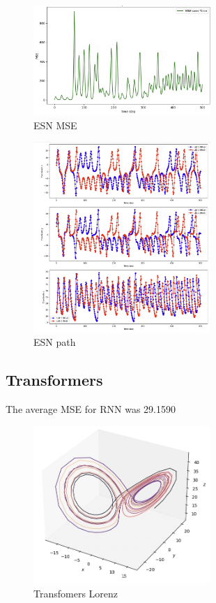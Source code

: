 \documentclass[11pt]{article}
\begin{document}
\begin{figure}[h]
\centering
\includegraphics[width=0.6\textwidth]{echo_mse.jpeg}
\caption{ESN MSE}
\end{figure}

\begin{figure}[h]
\centering
\includegraphics[width=0.6\textwidth]{echo_path.jpeg}
\caption{ESN path}
\end{figure}

\subsection{Transformers}
The average MSE for RNN was 29.1590

\begin{figure}[h]
\centering
\includegraphics[width=0.6\textwidth]{transformers_lorenz.jpeg}
\caption{Transfomers Lorenz}
\end{figure}
\end{document}
